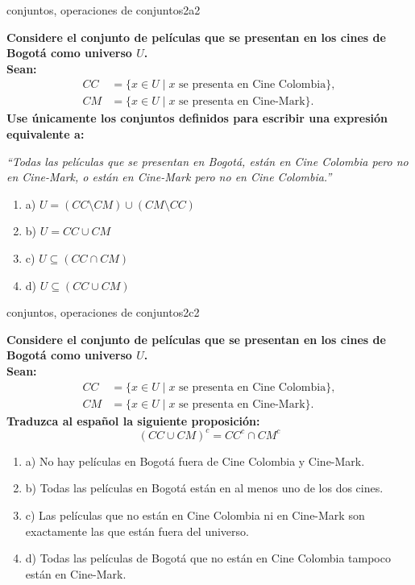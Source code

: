 \documentclass{article}
\begin{document}
\begin{question}{18}{conjuntos, operaciones de conjuntos}{2}{a}{2}{
\textbf{Considere el conjunto de películas que se presentan en los cines de Bogotá como universo \(U\).}\\
\textbf{Sean:}
\[
\begin{aligned}
CC &= \{x \in U \mid x\text{ se presenta en Cine Colombia}\},\\
CM &= \{x \in U \mid x\text{ se presenta en Cine-Mark}\}.
\end{aligned}
\]
\textbf{Use únicamente los conjuntos definidos para escribir una expresión equivalente a:} \medskip

\textit{“Todas las películas que se presentan en Bogotá, están en Cine Colombia pero no en Cine-Mark, o están en Cine-Mark pero no en Cine Colombia.”} \medskip

\begin{enumerate}
    \item a) \( U = (CC \setminus CM) \cup (CM \setminus CC) \)  
    \item b) \( U = CC \cup CM \)  
    \item c) \( U \subseteq (CC \cap CM) \)  
    \item d) \( U \subseteq (CC \cup CM) \)  
\end{enumerate}
}
\end{question}

\begin{question}{19}{conjuntos, operaciones de conjuntos}{2}{c}{2}{
\textbf{Considere el conjunto de películas que se presentan en los cines de Bogotá como universo \(U\).}\\
\textbf{Sean:}
\[
\begin{aligned}
CC &= \{x \in U \mid x\text{ se presenta en Cine Colombia}\},\\
CM &= \{x \in U \mid x\text{ se presenta en Cine-Mark}\}.
\end{aligned}
\]
\textbf{Traduzca al español la siguiente proposición:}
\[
(CC \cup CM)^c = CC^c \cap CM^c
\]

\begin{enumerate}
    \item a) No hay películas en Bogotá fuera de Cine Colombia y Cine-Mark.  
    \item b) Todas las películas en Bogotá están en al menos uno de los dos cines.  
    \item c) Las películas que no están en Cine Colombia ni en Cine-Mark son exactamente las que están fuera del universo.  
    \item d) Todas las películas de Bogotá que no están en Cine Colombia tampoco están en Cine-Mark.  
\end{enumerate}
}
\end{question}
\end{document}
